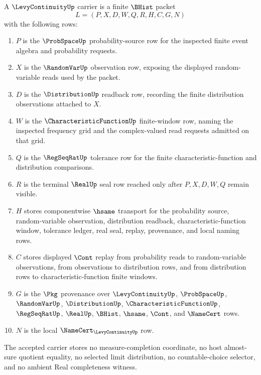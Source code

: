 \begin{definition}
\label{def:levy-continuity-carrier}
A $\LevyContinuityUp$ carrier is a finite $\BHist$ packet
$$
L=(P,X,D,W,Q,R,H,C,G,N)
$$
with the following rows:
\begin{enumerate}
\item $P$ is the $\ProbSpaceUp$ probability-source row for the inspected finite event algebra and probability requests.
\item $X$ is the $\RandomVarUp$ observation row, exposing the displayed random-variable reads used by the packet.
\item $D$ is the $\DistributionUp$ readback row, recording the finite distribution observations attached to $X$.
\item $W$ is the $\CharacteristicFunctionUp$ finite-window row, naming the inspected frequency grid and the complex-valued read requests admitted on that grid.
\item $Q$ is the $\RegSeqRatUp$ tolerance row for the finite characteristic-function and distribution comparisons.
\item $R$ is the terminal $\RealUp$ seal row reached only after $P,X,D,W,Q$ remain visible.
\item $H$ stores componentwise $\hsame$ transport for the probability source, random-variable observation, distribution readback, characteristic-function window, tolerance ledger, real seal, replay, provenance, and local naming rows.
\item $C$ stores displayed $\Cont$ replay from probability reads to random-variable observations, from observations to distribution rows, and from distribution rows to characteristic-function finite windows.
\item $G$ is the $\Pkg$ provenance over $\LevyContinuityUp$, $\ProbSpaceUp$, $\RandomVarUp$, $\DistributionUp$, $\CharacteristicFunctionUp$, $\RegSeqRatUp$, $\RealUp$, $\BHist$, $\hsame$, $\Cont$, and $\NameCert$ rows.
\item $N$ is the local $\NameCert_{\LevyContinuityUp}$ row.
\end{enumerate}
The accepted carrier stores no measure-completion coordinate, no host almost-sure quotient equality, no selected limit distribution, no countable-choice selector, and no ambient Real completeness witness.
\end{definition}

